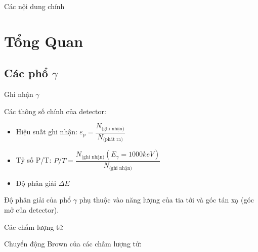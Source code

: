 \documentclass[10pt, t]{beamer}
\begin{document}
\logo{}

\begin{frame}{Các nội dung chính}
\tableofcontents
\end{frame}

\section{Tổng Quan}

\subsection{Các phổ $\gamma$}

\begin{frame}[label = ghinhan]{Ghi nhận $\gamma$}

Các thông số chính của detector:

\begin{itemize}

\item Hiệu suất ghi nhận: $\varepsilon_{p} = \dfrac{N_\text{(ghi nhận)}}{N_\text{(phát ra)}}$

\item Tỷ số P/T: $P/T = \dfrac{N_\text{(ghi nhận)}(E_{\gamma} = 1000 keV)}{N_\text{(ghi nhận)}}$

\item Độ phân giải $\Delta E$

\end{itemize}

Độ phân giải của phổ $\gamma$ phụ thuộc vào năng lượng của tia tới và góc tán xạ (góc mở của detector).

\end{frame}


\begin{frame}[label = chamluongtu]{Các chấm lượng tử}

Chuyển động Brown của các chấm lượng tử: 

\begin{center}


\end{center}

\end{frame}


%
\end{document}
